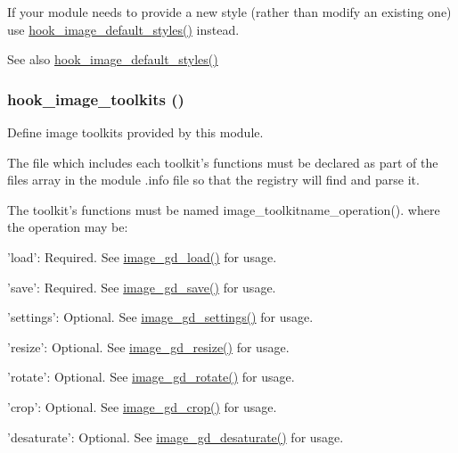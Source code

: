 If your module needs to provide a new style (rather than modify an existing one) use \hyperlink{group__hooks_ga856096251574b0df42813f6aff0d62ab}{hook\_\-image\_\-default\_\-styles()} instead.

\begin{DoxySeeAlso}{See also}
\hyperlink{group__hooks_ga856096251574b0df42813f6aff0d62ab}{hook\_\-image\_\-default\_\-styles()} 
\end{DoxySeeAlso}
\hypertarget{group__hooks_ga9abe202036afcc6a3cc97ccc2c13ab29}{
\subsubsection[{hook\_\-image\_\-toolkits}]{\setlength{\rightskip}{0pt plus 5cm}hook\_\-image\_\-toolkits ()}}
\label{group__hooks_ga9abe202036afcc6a3cc97ccc2c13ab29}
Define image toolkits provided by this module.

The file which includes each toolkit's functions must be declared as part of the files array in the module .info file so that the registry will find and parse it.

The toolkit's functions must be named image\_\-toolkitname\_\-operation(). where the operation may be:
\begin{DoxyItemize}
\item 'load': Required. See \hyperlink{group__image_gaa3b2912916ff9cfec8c7c8df8f3f1d75}{image\_\-gd\_\-load()} for usage.
\item 'save': Required. See \hyperlink{group__image_ga840179ad0e5ef2ea7619de19cab2d225}{image\_\-gd\_\-save()} for usage.
\item 'settings': Optional. See \hyperlink{group__image_ga2a492c31e41c59af2b7e976e28886b15}{image\_\-gd\_\-settings()} for usage.
\item 'resize': Optional. See \hyperlink{group__image_ga8d0c1abb541e01ec7a76a57add14a0b2}{image\_\-gd\_\-resize()} for usage.
\item 'rotate': Optional. See \hyperlink{group__image_gadfe1dec9bcb15c4b223acc64f35631d2}{image\_\-gd\_\-rotate()} for usage.
\item 'crop': Optional. See \hyperlink{group__image_ga80d6e99f7b538e40dac6b917bfff1bb1}{image\_\-gd\_\-crop()} for usage.
\item 'desaturate': Optional. See \hyperlink{group__image_ga2cb8090035dbb1a1e6a9c82cb52c9789}{image\_\-gd\_\-desaturate()} for usage.
\end{DoxyItemize}

